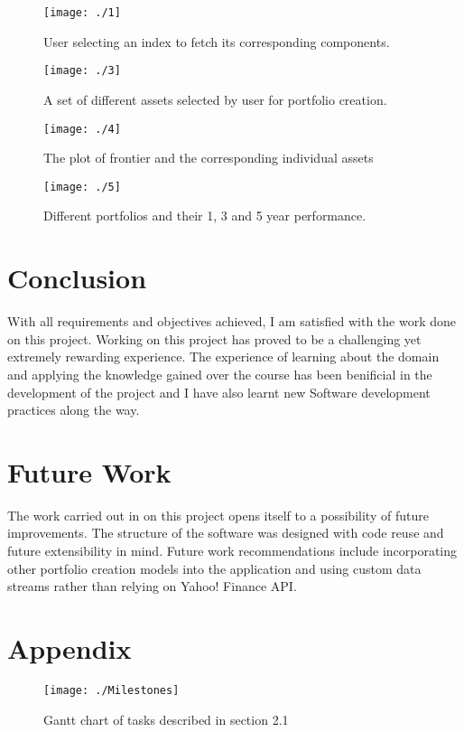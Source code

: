\begin{figure}[h]
\centering
\texttt{[image: ./1]}
\caption{User selecting an index to fetch its corresponding components.}
\label{fig:1}
\end{figure}

\begin{figure}[h]
\centering
\texttt{[image: ./3]}
\caption{A set of different assets selected by user for portfolio creation.}
\label{fig:3}
\end{figure}

\begin{figure}[!h]
\centering
\texttt{[image: ./4]}
\caption{The plot of frontier and the corresponding individual assets}
\label{fig:4}
\end{figure}

\begin{figure}[!h]
\centering
\texttt{[image: ./5]}
\caption{Different portfolios and their 1, 3 and 5 year performance.}
\label{fig:5}
\end{figure}


\section{Conclusion}
With all requirements and objectives achieved, I am satisfied with the work done on this project. Working on this project has proved to be a challenging yet extremely rewarding experience. The experience of learning about the domain and applying the knowledge gained over the course has been benificial in the development of the project and I have also learnt new Software development practices along the way.
\section{Future Work}
The work carried out in on this project opens itself to a possibility of future improvements. The structure of the software was designed with code reuse and future extensibility in mind. Future work recommendations include incorporating other portfolio creation models into the application and using custom data streams rather than relying on Yahoo! Finance API.
\vspace{-0.3cm}
\section{Appendix}
\begin{figure}[!h]
\centering
\vspace{-0.6cm}
\texttt{[image: ./Milestones]}
\caption{Gantt chart of tasks described in section 2.1}
\label{fig:Milestones}
\end{figure}

